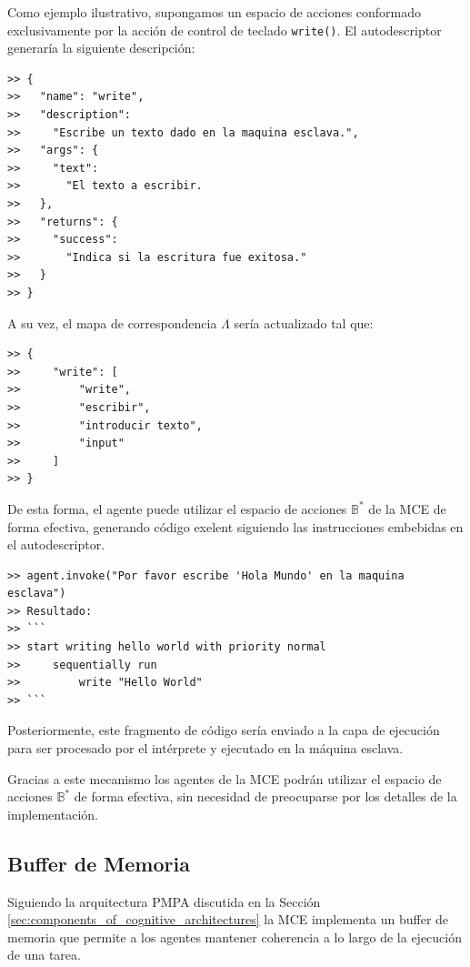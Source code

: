 Como ejemplo ilustrativo, supongamos un espacio de acciones conformado exclusivamente por
la acción de control de teclado \texttt{write()}. El autodescriptor generaría
la siguiente descripción:

\begin{lstlisting}[caption={Autodescriptor de acciones}, label={cod:autodescriptor_example}]
>> {
>>   "name": "write",
>>   "description":
>>     "Escribe un texto dado en la maquina esclava.",
>>   "args": {
>>     "text":
>>       "El texto a escribir.
>>   },
>>   "returns": {
>>     "success":
>>       "Indica si la escritura fue exitosa."
>>   }
>> }
\end{lstlisting}


A su vez, el mapa de correspondencia \(\Lambda\) sería actualizado tal que:
\begin{lstlisting}[caption={Mapa de correspondencia}, label={cod:correspondence_map_example}]
>> {
>>     "write": [
>>         "write",
>>         "escribir",
>>         "introducir texto",
>>         "input"
>>     ]
>> }
\end{lstlisting}
De esta forma, el agente puede utilizar el espacio de acciones \(\mathbb{B}^*\) de la MCE
de forma efectiva, generando código exelent siguiendo las instrucciones embebidas en el autodescriptor.

\begin{lstlisting}[caption={Ejemplo de uso del autodescriptor}, label={cod:autodescriptor_usage_example}]
>> agent.invoke("Por favor escribe 'Hola Mundo' en la maquina esclava")
>> Resultado: 
>> ```
>> start writing hello world with priority normal
>>     sequentially run
>>         write "Hello World"
>> ```

\end{lstlisting}

Posteriormente, este fragmento de código sería enviado a la capa de ejecución
para ser procesado por el intérprete y ejecutado en la máquina esclava.

Gracias a este mecanismo los agentes de la MCE podrán utilizar el espacio de
acciones \(\mathbb{B}^*\) de forma efectiva, sin necesidad de preocuparse por los
detalles de la implementación.

\subsection{Buffer de Memoria}
Siguiendo la arquitectura PMPA discutida en la Sección \ref{sec:components_of_cognitive_architectures}
la MCE implementa un buffer de memoria que permite a los agentes mantener coherencia
a lo largo de la ejecución de una tarea. 

